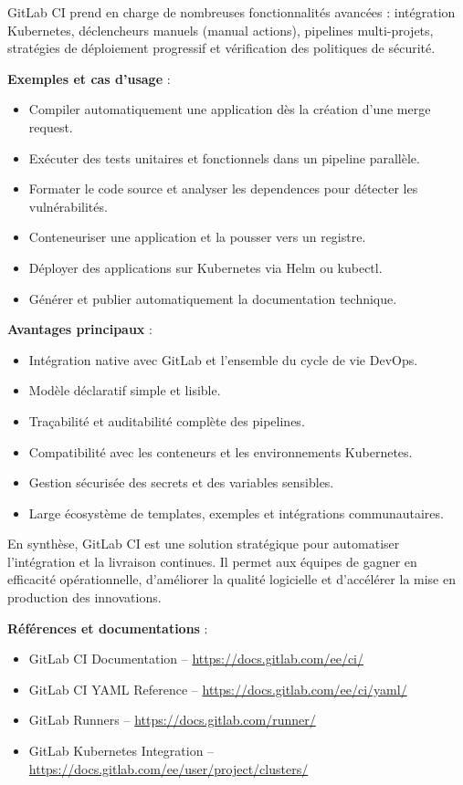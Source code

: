GitLab CI prend en charge de nombreuses fonctionnalités avancées  : intégration Kubernetes, déclencheurs manuels (manual actions), pipelines multi-projets, stratégies de déploiement progressif et vérification des politiques de sécurité.

\textbf{Exemples et cas d’usage} :
\begin{itemize}
	\item Compiler automatiquement une application dès la création d’une merge request.
	\item Exécuter des tests unitaires et fonctionnels dans un pipeline parallèle.
	\item Formater le code source et analyser les dependences pour détecter les vulnérabilités.
	\item Conteneuriser une application et la pousser vers un registre.
	\item Déployer des applications sur Kubernetes via Helm ou kubectl.
	\item Générer et publier automatiquement la documentation technique.
\end{itemize}

\textbf{Avantages principaux} :
\begin{itemize}
	\item Intégration native avec GitLab et l’ensemble du cycle de vie DevOps.
	\item Modèle déclaratif simple et lisible.
	\item Traçabilité et auditabilité complète des pipelines.
	\item Compatibilité avec les conteneurs et les environnements Kubernetes.
	\item Gestion sécurisée des secrets et des variables sensibles.
	\item Large écosystème de templates, exemples et intégrations communautaires.
\end{itemize}

En synthèse, GitLab CI est une solution stratégique pour automatiser l’intégration et la livraison continues. Il permet aux équipes de gagner en efficacité opérationnelle, d’améliorer la qualité logicielle et d’accélérer la mise en production des innovations.

\textbf{Références et documentations} :
\begin{itemize}
	\item GitLab CI Documentation – \url{https://docs.gitlab.com/ee/ci/}
	\item GitLab CI YAML Reference – \url{https://docs.gitlab.com/ee/ci/yaml/}
	\item GitLab Runners – \url{https://docs.gitlab.com/runner/}
	\item GitLab Kubernetes Integration – \url{https://docs.gitlab.com/ee/user/project/clusters/}
\end{itemize}

